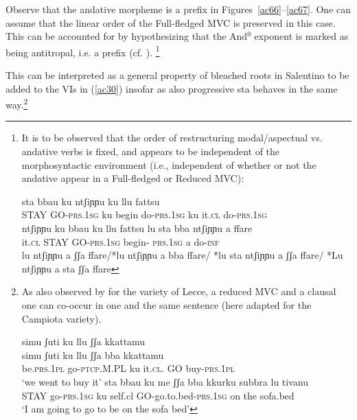 \documentclass[output=paper]{langscibook}
\begin{document}
Observe that the andative morpheme is a prefix in Figures~\ref{ac66}--\ref{ac67}.  One can assume that the linear order of the Full-fledged MVC is preserved in this case.  This can be accounted for by hypothesizing that the And$^0$ exponent is marked as being antitropal, i.e. a prefix (cf. \citealt{bye2012a}).
\footnote{It is to be observed that the order of restructuring modal/aspectual vs. andative verbs is fixed, and appears to be independent of the morphosyntactic environment (i.e., independent of whether or not the andative appear in a Full-fledged or Reduced MVC):

\ea \label{fn32ex}
    \ea \label{fn32exa}\gll sta bbau   ku ntʃiɲɲu   ku llu  fattsu\\
STAY GO-\textsc{prs}.\textsc{1sg} ku  begin do-\textsc{prs}.\textsc{1sg}  ku it.\textsc{cl} do-\textsc{prs}.\textsc{1sg}\\
\glt *ntʃiɲɲu ku bbau ku llu fattsu
    \ex \label{fn32exb}\gll lu  sta  bba   ntʃiɲɲu      a   ffare\\
it.\textsc{cl}  STAY GO-\textsc{prs}.\textsc{1sg} begin- \textsc{prs}.\textsc{1sg}  a   do-\textsc{inf}\\
\glt *lu ntʃiɲɲu a ʃʃa ffare/*lu ntʃiɲɲu a bba ffare/ *lu sta ntʃiɲɲu a ʃʃa ffare/ *Lu  ntʃiɲɲu a sta ʃʃa ffare
    \z
\z

}

This can be interpreted as a general property of bleached roots in Salentino to be added to the VIs in (\ref{ac30}) insofar as also progressive sta behaves in the same way.\footnote{As also observed by \citealt{ledgeway2016a} for the variety of Lecce, a reduced MVC and a clausal one can co-occur in one and the same sentence (here adapted for the Campiota variety).

\ea \label{fn33ex}
    \ea \label{fn33exa}\glll simu      ʃuti        ku   llu     ʃʃa {} kkattamu\\
  simu      ʃuti       ku   llu    ʃʃa  bba kkattamu\\
  be.\textsc{prs}.\textsc{1pl} go-\textsc{ptcp}.M.PL  ku   it.\textsc{cl}.    GO  buy-\textsc{prs}.\textsc{1pl}\\
\glt  ‘we went to buy it’
    \ex \label{fn33exb}
    \gll sta   bbau                         ku  me       {ʃʃa bba           kkurku}      subbra lu tivanu\\
         STAY  go-\textsc{prs}.\textsc{1sg} ku  self.cl  GO-go.to.bed-\textsc{prs}.\textsc{1sg} on  the sofa.bed\\
    \glt ‘I am going to go to be on the sofa bed’
    \z
\z}
\end{document}
